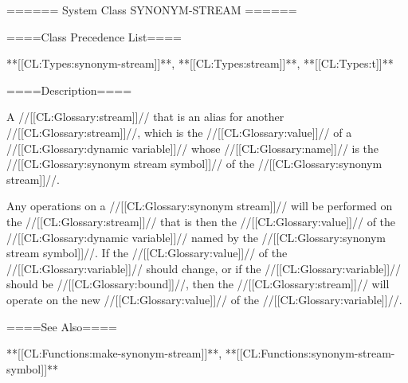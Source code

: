 ====== System Class SYNONYM-STREAM ======

====Class Precedence List====

**[[CL:Types:synonym-stream]]**, **[[CL:Types:stream]]**, **[[CL:Types:t]]**

====Description====

A //[[CL:Glossary:stream]]// that is an alias for another //[[CL:Glossary:stream]]//, which is the //[[CL:Glossary:value]]// of a //[[CL:Glossary:dynamic variable]]// whose //[[CL:Glossary:name]]// is the //[[CL:Glossary:synonym stream symbol]]// of the //[[CL:Glossary:synonym stream]]//.

Any operations on a //[[CL:Glossary:synonym stream]]// will be performed on the //[[CL:Glossary:stream]]// that is then the //[[CL:Glossary:value]]// of the //[[CL:Glossary:dynamic variable]]// named by the //[[CL:Glossary:synonym stream symbol]]//. If the //[[CL:Glossary:value]]// of the //[[CL:Glossary:variable]]// should change, or if the //[[CL:Glossary:variable]]// should be //[[CL:Glossary:bound]]//, then the //[[CL:Glossary:stream]]// will operate on the new //[[CL:Glossary:value]]// of the //[[CL:Glossary:variable]]//.

====See Also====

**[[CL:Functions:make-synonym-stream]]**, **[[CL:Functions:synonym-stream-symbol]]**

 
